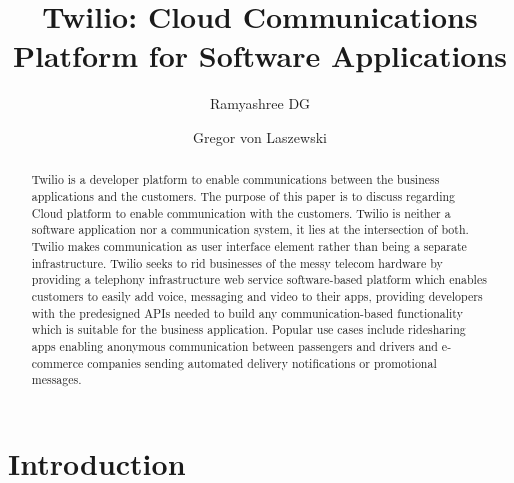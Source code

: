
\title{Twilio: Cloud Communications Platform for Software Applications}


\author{Ramyashree DG}


\author{Gregor von Laszewski}


\renewcommand{\shortauthors}{G. v. Laszewski}


\begin{abstract}

Twilio is a  developer platform to enable communications between the business 
applications and the customers. The purpose of this paper is to discuss 
regarding Cloud platform to enable communication with the customers. Twilio is 
neither a software application nor a communication system, it lies at the 
intersection of both. Twilio makes communication as user interface element 
rather than being a separate infrastructure. Twilio seeks to rid businesses of 
the messy telecom hardware by providing a telephony infrastructure web service
software-based platform which enables customers to easily add voice, messaging
and video to their apps,  providing developers with the predesigned APIs needed
to build any communication-based functionality which is suitable for the 
business application. Popular use cases include ridesharing apps enabling 
anonymous communication between passengers and drivers and e-commerce companies
sending automated delivery notifications or promotional messages.

\end{abstract}


\maketitle

\section{Introduction}

